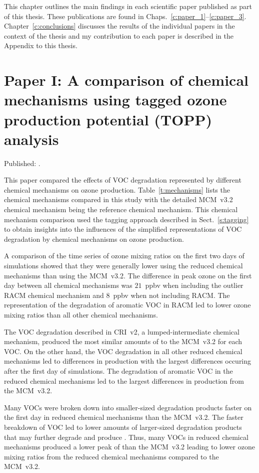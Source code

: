 This chapter outlines the main findings in each scientific paper published as part of this thesis.
These publications are found in Chaps.~\ref{c:paper_1}--\ref{c:paper_3}.
Chapter~\ref{c:conclusions} discusses the results of the individual papers in the context of the thesis and my contribution to each paper is described in the Appendix to this thesis.

\singlespacing
\section{Paper I: A comparison of chemical mechanisms using tagged ozone production potential (TOPP) analysis} \label{s:chemical_mechanism_results} 
\onehalfspacing

\noindent
Published: .
\vspace{5mm}

This paper compared the effects of VOC degradation represented by different chemical mechanisms on ozone production.
Table~\ref{t:mechanisms} lists the chemical mechanisms compared in this study with the detailed MCM~v3.2 chemical mechanism being the reference chemical mechanism.
This chemical mechanism comparison used the tagging approach described in Sect.~\ref{s:tagging} to obtain insights into the influences of the simplified representations of VOC degradation by chemical mechanisms on ozone production.

\newpage
A comparison of the time series of ozone mixing ratios on the first two days of simulations showed that they were generally lower using the reduced chemical mechanisms than using the MCM~v3.2.
The difference in peak ozone on the first day between all chemical mechanisms was $21$~ppbv when including the outlier RACM chemical mechanism and $8$~ppbv when not including RACM.
The representation of the degradation of aromatic VOC in RACM led to lower ozone mixing ratios than all other chemical mechanisms.

The VOC degradation described in CRI~v2, a lumped-intermediate chemical mechanism, produced the most similar amounts of  to the MCM~v3.2 for each VOC.
On the other hand, the VOC degradation in all other reduced chemical mechanisms led to differences in  production with the largest differences occuring after the first day of simulations.
The degradation of aromatic VOC in the reduced chemical mechanisms led to the largest differences in  production from the MCM~v3.2.

Many VOCs were broken down into smaller-sized degradation products faster on the first day in reduced chemical mechanisms than the MCM~v3.2.
The faster breakdown of VOC led to lower amounts of larger-sized degradation products that may further degrade and produce .
Thus, many VOCs in reduced chemical mechanisms produced a lower peak of  than the MCM~v3.2 leading to lower ozone mixing ratios from the reduced chemical mechanisms compared to the MCM~v3.2.

